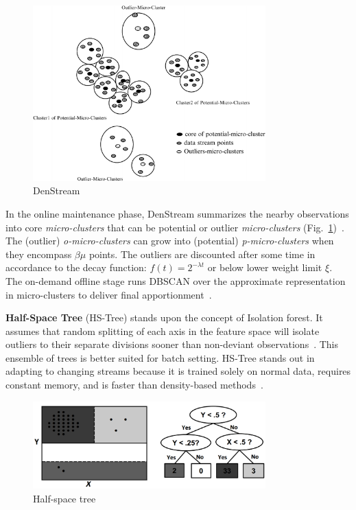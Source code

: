\begin{figure}[ht]
    \centering
    \includegraphics[width=0.8\textwidth]{assets/DenStream.png}
    \caption{DenStream~\cite{amini_density_2012}}
    \label{fig:denstream}
\end{figure}

In the online maintenance phase, DenStream summarizes the nearby observations into core \emph{micro-clusters} that can be potential or outlier \emph{micro-clusters} (Fig.~\ref{fig:denstream})~\cite{ghesmoune_state---art_2016}. The (outlier) \emph{o-micro-clusters} can grow into (potential) \emph{p-micro-clusters} when they encompass $\beta \mu$ points. The outliers are discounted after some time in accordance to the decay function: $f(t) = 2^{-\lambda t}$ or below lower weight limit $\xi$. The on-demand offline stage runs DBSCAN over the approximate representation in micro-clusters to deliver final apportionment~\cite{cao_density-based_2006}.
\bigbreak

\textbf{Half-Space Tree} (HS-Tree) stands upon the concept of Isolation forest. It assumes that random splitting of each axis in the feature space will isolate outliers to their separate divisions sooner than non-deviant observations~\cite{gervasi_anomaly_2020,torres_automatic_2022}. This ensemble of trees is better suited for batch setting. HS-Tree stands out in adapting to changing streams because it is trained solely on normal data, requires constant memory, and is faster than density-based methods~\cite{tan_fast_2011}.

\begin{figure}[ht]
    \centering
    \includegraphics[width=0.8\textwidth]{assets/HS-Tree.png}
    \caption{Half-space tree~\cite{tan_fast_2011}}
\end{figure}

